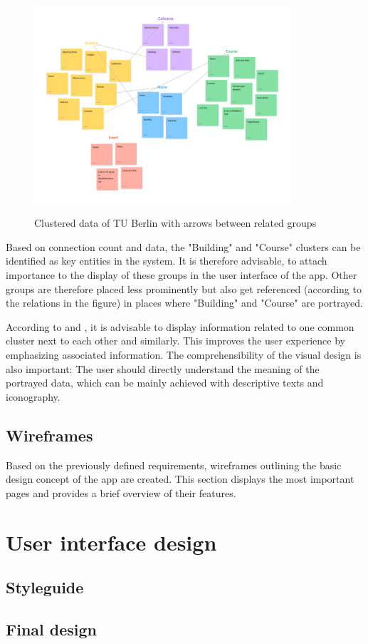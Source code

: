 \begin{figure}[H]
	\centering
	\includegraphics[width=0.85\textwidth]{images/information_clustering.png}\\
	\caption{Clustered data of TU Berlin with arrows between related groups}
\end{figure}

Based on connection count and data, the "Building" and "Course" clusters can be identified as key entities in the system. It is therefore advisable, to attach importance to the display of these groups in the user interface of the app. Other groups are therefore placed less prominently but also get referenced (according to the relations in the figure) in places where "Building" and "Course" are portrayed.

According to \cite{law_of_common_region} and \cite{law_of_similarity}, it is advisable to display information related to one common cluster next to each other and similarly. This improves the user experience by emphasizing associated information. The comprehensibility of the visual design is also important: The user should directly understand the meaning of the portrayed data, which can be mainly achieved with descriptive texts and iconography.

\subsection{Wireframes}
Based on the previously defined requirements, wireframes outlining the basic design concept of the app are created. This section displays the most important pages and provides a brief overview of their features.



\section{User interface design}

\subsection{Styleguide}
\subsection{Final design}
